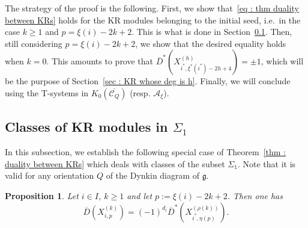 \documentclass[12pt]{amsart}
\theoremstyle{plain}
\newtheorem{proposition}[theorem]{Proposition}
\theoremstyle{definition}
\numberwithin{equation}{section}
\newcommand{\barD}{\overline{D}}
\newcommand{\barDstar}{\overline{D}^{*}}
\newcommand{\barCQ}{\overline{\mathcal{C}_Q}}
\begin{document}
The strategy of the proof is the following. First, we show that~\eqref{eq : thm duality between KRs} holds for the KR modules belonging to the initial seed, i.e.\ in the case $k \geq 1$ and $p = \xi(i)-2k+2$. This is what is done in Section~\ref{sec : duality for initials KRs}. Then, still considering $p= \xi(i)-2k+2$, we show that the desired equality holds when $k=0$. This amounts to prove that $ \barDstar \left( X_{i^{*}, \xi^{*}(i^{*}) -2h + 4}^{(h)}  \right) = \pm 1$, which will be the purpose of Section~\ref{sec : KR whose deg is h}. Finally, we will conclude using the T-systems in $K_0(\barCQ)$ (resp. $\mathcal{A}_{\xi}$). 


     
\subsection{Classes of KR modules in \texorpdfstring{$\Sigma_1$}{Sigma1}}
 \label{sec : duality for initials KRs}

 In this subsection, we establish the following special case of Theorem~\ref{thm : duality between KRs} which deals with classes of the subset $\Sigma_1$. Note that it is valid for any orientation $Q$ of the Dynkin diagram of $\mathfrak{g}$. 

  \begin{proposition} \label{prop : duality for initial KRs}
 Let $i \in I$, $k \geq 1$ and let $p := \xi(i)-2k+2$. Then one has
   $$ \barD \left(  X_{i,p}^{(k)} \right) = (-1)^{d_i} \barDstar \left( X_{i^{*}, \eta(p)}^{(\rho(k))}  \right) . $$
  \end{proposition}
\end{document}
